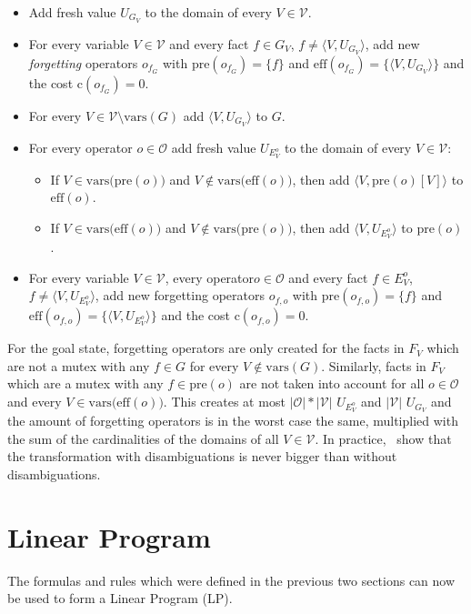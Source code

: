 \begin{itemize}
    \item Add fresh value $U_{G_V}$ to the domain of every $V\in\mathcal{V}$.
    \item For every variable $V\in\mathcal{V}$ and every fact $f\in G_V$, $f\neq\langle V,U_{G_V}\rangle$, add new \textit{forgetting} operators $o_{f_G}$ with $\text{pre}(o_{f_G})=\{f\}$ and $\text{eff}(o_{f_G})=\{\langle V,U_{G_V}\rangle\}$ and the cost $\text{c}(o_{f_G})=0$.
    \item For every $V\in\mathcal{V}\setminus\text{vars}(G)$ add $\langle V,U_{G_V}\rangle$ to $G$.
    \item For every operator $o\in\mathcal{O}$ add fresh value $U_{E^o_V}$ to the domain of every $V\in\mathcal{V}$:
    \begin{itemize}
        \item If $V\in\text{vars(pre}(o))$ and $V\notin\text{vars(eff}(o))$, then add $\langle V,\text{pre}(o)[V]\rangle$ to $\text{eff}(o)$.
        \item If $V\in\text{vars(eff}(o))$ and $V\notin\text{vars(pre}(o))$, then add $\langle V,U_{E^o_V}\rangle$ to $\text{pre}(o)$.
    \end{itemize}
    \item For every variable $V\in\mathcal{V}$, every operator$o\in\mathcal{O}$ and every fact $f\in E_V^o$, $f\neq\langle V,U_{E^o_V}\rangle$, add new forgetting operators $o_{f,o}$ with $\text{pre}(o_{f,o})=\{f\}$ and $\text{eff}(o_{f,o})=\{\langle V,U_{E^o_V}\rangle\}$ and the cost $\text{c}(o_{f,o})=0$.
\end{itemize}

For the goal state, forgetting operators are only created for the facts in $F_V$ which are not a mutex with any $f\in G$ for every $V\notin\text{vars}(G)$.
Similarly, facts in $F_V$ which are a mutex with any $f\in\text{pre}(o)$ are not taken into account for all $o\in\mathcal{O}$ and every $V\in\text{vars(eff}(o))$.
This creates at most $|\mathcal{O}|*|\mathcal{V}|$ $U_{E_V^o}$ and $|\mathcal{V}|$ $U_{G_V}$ and the amount of forgetting operators is in the worst case the same, multiplied with the sum of the cardinalities of the domains of all $V\in\mathcal{V}$.
In practice,~\citeauthor{fivser2020strengthening} show that the transformation with disambiguations is never bigger than without disambiguations.

\section{Linear Program}\label{sec:linear-programm}
The formulas and rules which were defined in the previous two sections can now be used to form a Linear Program (LP).

